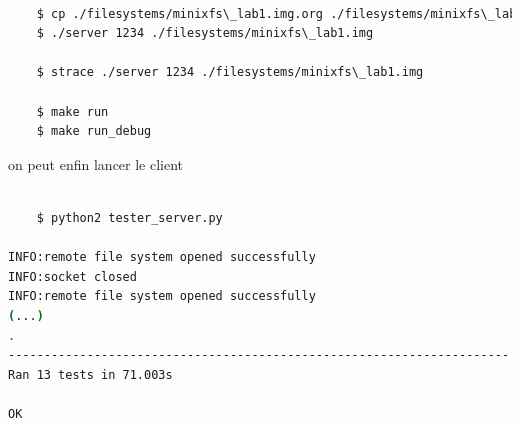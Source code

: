 \documentclass[a4paper,12pt]{article}
\begin{document}
\begin{lstlisting}[language=bash,caption={lancer le server}]

	$ cp ./filesystems/minixfs\_lab1.img.org ./filesystems/minixfs\_lab1.img
	$ ./server 1234 ./filesystems/minixfs\_lab1.img
	
	$ strace ./server 1234 ./filesystems/minixfs\_lab1.img

	$ make run
	$ make run_debug
\end{lstlisting}

on peut enfin lancer le client\\
\begin{lstlisting}[language=bash,caption={lancer le client}]
	
	$ python2 tester_server.py
  
INFO:remote file system opened successfully
INFO:socket closed
INFO:remote file system opened successfully
(...)
.
----------------------------------------------------------------------
Ran 13 tests in 71.003s

OK

\end{lstlisting}

\end{document}
